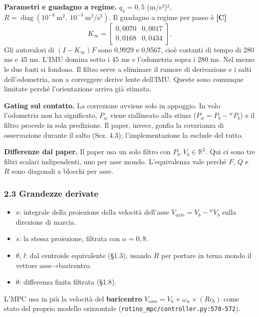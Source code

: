 \documentclass[
]{article}
\providecommand{\tightlist}{%
  \setlength{\itemsep}{0pt}\setlength{\parskip}{0pt}}
\begin{document}
\textbf{Parametri e guadagno a regime.} \(q_a = 0{,}5\) (m/s²)², \(R = \operatorname{diag}(10^{-4}\ \text{m}^2,\ 10^{-3}\ \text{m}^2/\text{s}^2)\). Il guadagno a regime per passo è \textbf{[C]} \[K_\infty = \begin{bmatrix}0{,}0070 & 0{,}0017\\ 0{,}0168 & 0{,}0434\end{bmatrix}.\] Gli autovalori di \((I-K_\infty)F\) sono 0,9929 e 0,9567, cioè costanti di tempo di 280 ms e 45 ms. L'IMU domina sotto i 45 ms e l'odometria sopra i 280 ms. Nel mezzo le due fonti si fondono. Il filtro serve a eliminare il rumore di derivazione e i salti dell'odometria, non a correggere derive lente dell'IMU. Queste sono comunque limitate perché l'orientazione arriva già stimata.

\textbf{Gating sul contatto.} La correzione avviene solo in appoggio. In volo l'odometria non ha significato, \(P_w\) viene riallineato alla stima (\(P_w = P_b - {}^wP_b\)) e il filtro procede in sola predizione. Il paper, invece, gonfia la covarianza di osservazione durante il salto (Sez. 4.3); l'implementazione la esclude del tutto.

\textbf{Differenze dal paper.} Il paper usa un solo filtro con \(P_b, V_b\in\mathbb R^2\). Qui ci sono tre filtri scalari indipendenti, uno per asse mondo. L'equivalenza vale perché \(F\), \(Q\) e \(R\) sono diagonali a blocchi per asse.

\subsubsection{2.3 Grandezze derivate}\label{23-grandezze-derivate}

\begin{itemize}
\tightlist
\item \(s\): integrale della proiezione della velocità dell'asse \(V_{axle} = V_b - {}^wV_b\) sulla direzione di marcia.
\item \(\dot s\): la stessa proiezione, filtrata con \(\alpha = 0{,}8\).
\item \(\theta\), \(l\): dal centroide equivalente (§1.3), usando \(R\) per portare in terna mondo il vettore asse→baricentro.
\item \(\dot\theta\): differenza finita filtrata (§1.8).
\end{itemize}

L'MPC usa in più la velocità del \textbf{baricentro} \(V_{com} = V_b + \omega_w\times(Rc_b)\) come stato del proprio modello orizzontale (\texttt{rotino\_mpc/controller.py:570-572}).
\end{document}
